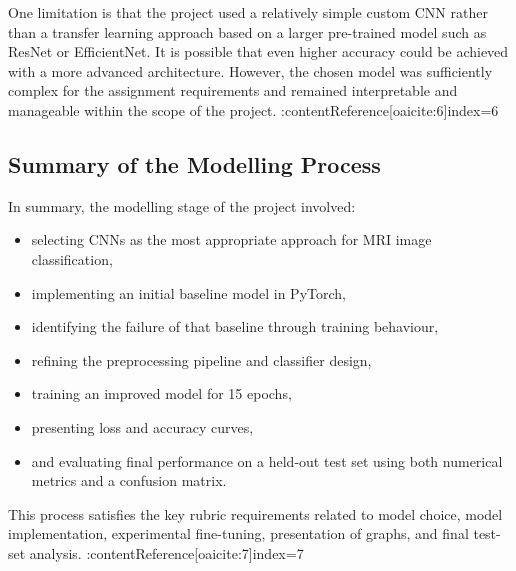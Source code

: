 \documentclass{article}
\begin{document}
One limitation is that the project used a relatively simple custom CNN rather than a transfer learning approach based on a larger pre-trained model such as ResNet or EfficientNet. It is possible that even higher accuracy could be achieved with a more advanced architecture. However, the chosen model was sufficiently complex for the assignment requirements and remained interpretable and manageable within the scope of the project. :contentReference[oaicite:6]{index=6}

\subsection{Summary of the Modelling Process}

In summary, the modelling stage of the project involved:
\begin{itemize}
    \item selecting CNNs as the most appropriate approach for MRI image classification,
    \item implementing an initial baseline model in PyTorch,
    \item identifying the failure of that baseline through training behaviour,
    \item refining the preprocessing pipeline and classifier design,
    \item training an improved model for 15 epochs,
    \item presenting loss and accuracy curves,
    \item and evaluating final performance on a held-out test set using both numerical metrics and a confusion matrix.
\end{itemize}

This process satisfies the key rubric requirements related to model choice, model implementation, experimental fine-tuning, presentation of graphs, and final test-set analysis. :contentReference[oaicite:7]{index=7}
\end{document}
